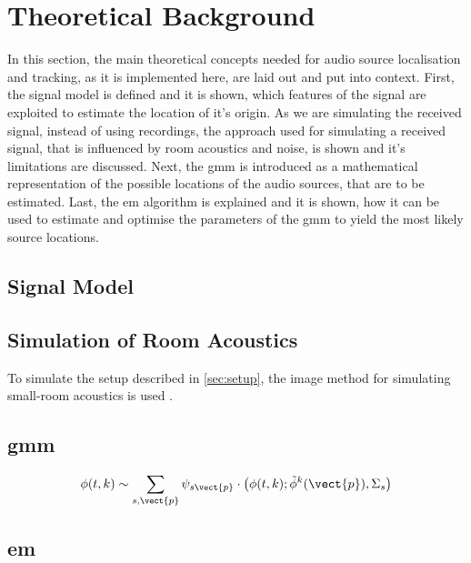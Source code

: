 \chapter{Theoretical Background}
\label{chap:theory}


In this section, the main theoretical concepts needed for audio source localisation and tracking, as it is implemented here, are laid out and put into context. First, the signal model is defined and it is shown, which features of the signal are exploited to estimate the location of it's origin. As we are simulating the received signal, instead of using recordings, the approach used for simulating a received signal, that is influenced by room acoustics and noise, is shown and it's limitations are discussed. Next, the \gls{gmm} is introduced as a mathematical representation of the possible locations of the audio sources, that are to be estimated. Last, the \gls{em} algorithm is explained and it is shown, how it can be used to estimate and optimise the parameters of the \gls{gmm} to yield the most likely source locations.

\section{Signal Model}
\label{sec:signal}


\section{Simulation of Room Acoustics}
\label{sec:simulation}
To simulate the setup described in \ref{sec:setup}, the image method for simulating small-room acoustics is used \cite{Allen1979}.

\section{\acrfull{gmm}}
\label{sec:gmm}
\begin{equation}
	\phi(t,k)\sim\sum_{s,\vect{p}}\psi_{s\vect{p}}\cdot\big(\phi(t,k);\tilde\phi^k(\vect{p}),\Sigma_s\big)
\end{equation}

\section{\acrfull{em}}
\label{sec:em}
